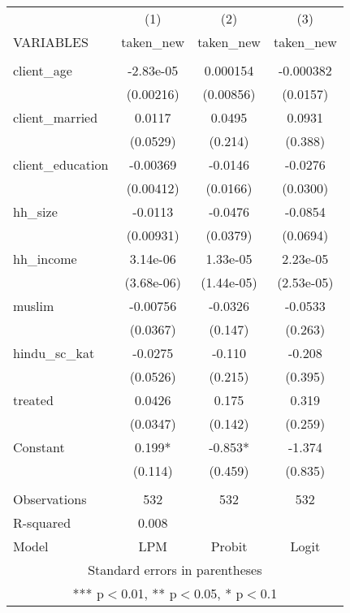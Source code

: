 \begin{tabular}{lccc} \hline
 & (1) & (2) & (3) \\
VARIABLES & taken\_new & taken\_new & taken\_new \\ \hline
 &  &  &  \\
client\_age & -2.83e-05 & 0.000154 & -0.000382 \\
 & (0.00216) & (0.00856) & (0.0157) \\
client\_married & 0.0117 & 0.0495 & 0.0931 \\
 & (0.0529) & (0.214) & (0.388) \\
client\_education & -0.00369 & -0.0146 & -0.0276 \\
 & (0.00412) & (0.0166) & (0.0300) \\
hh\_size & -0.0113 & -0.0476 & -0.0854 \\
 & (0.00931) & (0.0379) & (0.0694) \\
hh\_income & 3.14e-06 & 1.33e-05 & 2.23e-05 \\
 & (3.68e-06) & (1.44e-05) & (2.53e-05) \\
muslim & -0.00756 & -0.0326 & -0.0533 \\
 & (0.0367) & (0.147) & (0.263) \\
hindu\_sc\_kat & -0.0275 & -0.110 & -0.208 \\
 & (0.0526) & (0.215) & (0.395) \\
treated & 0.0426 & 0.175 & 0.319 \\
 & (0.0347) & (0.142) & (0.259) \\
Constant & 0.199* & -0.853* & -1.374 \\
 & (0.114) & (0.459) & (0.835) \\
 &  &  &  \\
Observations & 532 & 532 & 532 \\
R-squared & 0.008 &  &  \\
 Model & LPM & Probit & Logit \\ \hline
\multicolumn{4}{c}{ Standard errors in parentheses} \\
\multicolumn{4}{c}{ *** p$<$0.01, ** p$<$0.05, * p$<$0.1} \\
\end{tabular}
